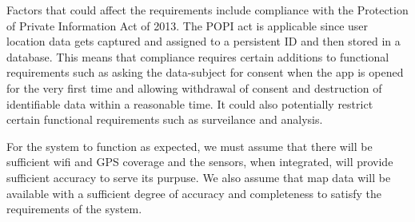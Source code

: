 Factors that could affect the requirements include compliance with the Protection of Private Information Act of 2013. The POPI act is applicable since user location data gets captured and assigned to a persistent ID and then stored in a database. This means that compliance requires certain additions to functional requirements such as asking the data-subject for consent when the app is opened for the very first time and allowing withdrawal of consent and destruction of identifiable data within a reasonable time. It could also potentially restrict certain functional requirements such as surveilance and analysis.
\par
\bigskip
\noindent
For the system to function as expected, we must assume that there will be sufficient wifi and GPS coverage and the sensors, when integrated, will provide sufficient accuracy to serve its purpuse. We also assume that map data will be available with a sufficient degree of accuracy and completeness to satisfy the requirements of the system.
